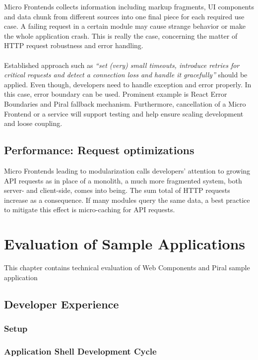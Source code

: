 \documentclass[a4paper]{book}
\begin{document}
Micro Frontends collects information including markup fragments, UI components and data chunk from different sources into one final piece for each required use case. A failing request in a certain module may cause strange behavior or make the whole application crash. This is really the case, concerning the matter of HTTP request robustness and error handling.
\\ \\
Established approach such as \textit{“set (very) small timeouts, introduce retries for critical requests and detect a connection loss and handle it gracefully”} \cite{Rap20} should be applied. Even though, developers need to handle exception and error properly. In this case, error boundary can be used. Prominent example is React Error Boundaries and Piral fallback mechanism. Furthermore, cancellation of a Micro Frontend or a service will support testing and help ensure scaling development and loose coupling.

\section{Performance: Request optimizations}
Micro Frontends leading to modularization calls developers’ attention to growing API requests as in place of a monolith, a much more fragmented system, both server- and client-side, comes into being. The sum total of HTTP requests increase as a consequence. If many modules query the same data, a best practice to mitigate this effect is micro-caching for API requests. 
\chapter{Evaluation of Sample Applications} \label{Evaluation of Sample Applications}
This chapter contains technical evaluation of Web Components and Piral sample application
\section{Developer Experience}
\subsection{Setup}
\subsection{Application Shell Development Cycle}
\end{document}
